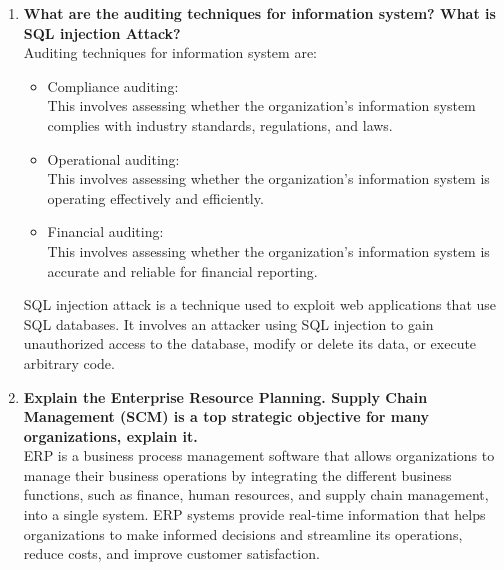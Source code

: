 \documentclass[12pt]{article}
\begin{document}
\begin{enumerate}
    
    \item {\bfseries What are the auditing techniques for information system? What is SQL injection Attack?\\}
    Auditing techniques for information system are:
    \begin{itemize}
        \item Compliance auditing:\\ This involves assessing whether the organization's information system complies with industry standards, regulations, and laws.
        \item Operational auditing:\\ This involves assessing whether the organization's information system is operating effectively and efficiently.
        \item Financial auditing:\\ This involves assessing whether the organization's information system is accurate and reliable for financial reporting.
    \end{itemize}
    SQL injection attack is a technique used to exploit web applications that use SQL databases. It involves an attacker using SQL injection to gain unauthorized access to the database, modify or delete its data, or execute arbitrary code.

    \item {\bfseries Explain the Enterprise Resource Planning. Supply Chain Management (SCM) is a top strategic objective for many organizations, explain it.\\}
    ERP is a business process management software that allows organizations to manage their business operations by integrating the different business functions, such as finance, human resources, and supply chain management, into a single system. ERP systems provide real-time information that helps organizations to make informed decisions and streamline its operations, reduce costs, and improve customer satisfaction.
    

\end{enumerate}
\end{document}
